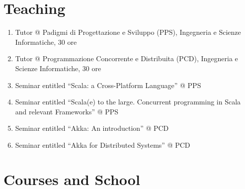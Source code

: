 \documentclass[11pt]{article}
\begin{document}
\section{Teaching}
\begin{enumerate}
	\item Tutor @ Padigmi di Progettazione e Sviluppo (PPS), Ingegneria e Scienze Informatiche, 30 ore
	\item Tutor @ Programmazione Concorrente e Distribuita (PCD), Ingegneria e Scienze Informatiche, 30 ore
	\item Seminar entitled ``Scala: a Cross-Platform Language'' @ PPS
	\item Seminar entitled ``Scala(e) to the large. Concurrent programming in Scala and relevant Frameworks'' @ PPS
	\item Seminar entitled ``Akka: An introduction'' @ PCD
	\item Seminar entitled ``Akka for Distributed Systems'' @ PCD
\end{enumerate}
\section{Courses and School}
\end{document}
